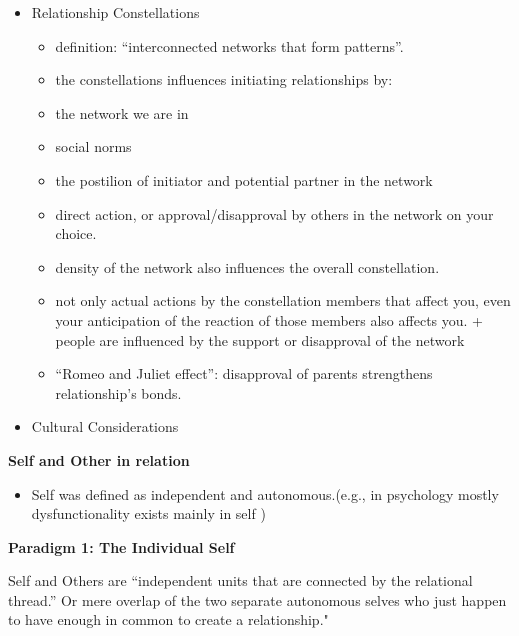 \documentclass[
]{book}
\providecommand{\tightlist}{%
  \setlength{\itemsep}{0pt}\setlength{\parskip}{0pt}}
\begin{document}
\begin{itemize}
\item
  Relationship Constellations\\

  \begin{itemize}
  \tightlist
  \item
    definition: ``interconnected networks that form patterns''.\\
  \item
    the constellations influences initiating relationships by:\\
  \item
    the network we are in\\
  \item
    social norms\\
  \item
    the postilion of initiator and potential partner in the network\\
  \item
    direct action, or approval/disapproval by others in the network on your choice.\\
  \item
    density of the network also influences the overall constellation.\\
  \item
    not only actual actions by the constellation members that affect you, even your anticipation of the reaction of those members also affects you. \citep{Surra_1990} + people are influenced by the support or disapproval of the network\\
  \item
    ``Romeo and Juliet effect'': disapproval of parents strengthens relationship's bonds.
  \end{itemize}
\item
  Cultural Considerations
\end{itemize}

\textbf{Self and Other in relation}

\begin{itemize}
\tightlist
\item
  Self was defined as independent and autonomous.(e.g., in psychology mostly dysfunctionality exists mainly in self )
\end{itemize}

\textbf{Paradigm 1: The Individual Self}

Self and Others are ``independent units that are connected by the relational thread.'' Or mere overlap of the two separate autonomous selves who just happen to have enough in common to create a relationship."
\end{document}
